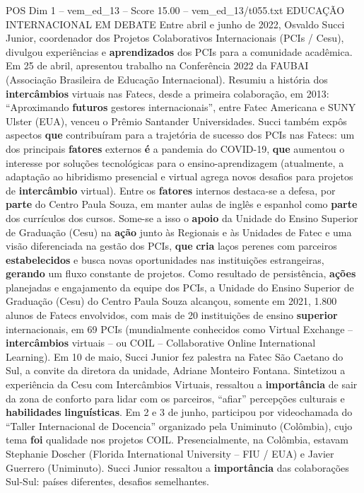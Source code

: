\begin{textsample}{POS Dim 1 – vem\_ed\_13 – Score 15.00 – vem\_ed\_13/t055.txt}  \label{ex:f1_pos_123}
EDUCAÇÃO INTERNACIONAL EM DEBATE Entre abril e junho de 2022, Osvaldo Succi Junior, coordenador dos Projetos Colaborativos Internacionais (PCIs / Cesu), divulgou experiências e \textbf{aprendizados} dos PCIs para a comunidade acadêmica.
Em 25 de abril, apresentou trabalho na Conferência 2022 da FAUBAI (Associação Brasileira de Educação Internacional).
Resumiu a história dos \textbf{intercâmbios} virtuais nas Fatecs, desde a primeira colaboração, em 2013: “Aproximando \textbf{futuros} gestores internacionais”, entre Fatec Americana e SUNY Ulster (EUA), venceu o Prêmio Santander Universidades.
Succi também expôs aspectos \textbf{que} contribuíram para a trajetória de sucesso dos PCIs nas Fatecs: um dos principais \textbf{fatores} externos \textbf{é} a pandemia do COVID-19, \textbf{que} aumentou o interesse por soluções tecnológicas para o ensino-aprendizagem (atualmente, a adaptação ao hibridismo presencial e virtual agrega novos desafios para projetos de \textbf{intercâmbio} virtual).
Entre os \textbf{fatores} internos destaca-se a defesa, por \textbf{parte} do Centro Paula Souza, em manter aulas de inglês e espanhol como \textbf{parte} dos currículos dos cursos.
Some-se a isso o \textbf{apoio} da Unidade do Ensino Superior de Graduação (Cesu) na \textbf{ação} junto às Regionais e às Unidades de Fatec e uma visão diferenciada na gestão dos PCIs, \textbf{que} \textbf{cria} laços perenes com parceiros \textbf{estabelecidos} e busca novas oportunidades nas instituições estrangeiras, \textbf{gerando} um fluxo constante de projetos.
Como resultado de persistência, \textbf{ações} planejadas e engajamento da equipe dos PCIs, a Unidade do Ensino Superior de Graduação (Cesu) do Centro Paula Souza alcançou, somente em 2021, 1.800 alunos de Fatecs envolvidos, com mais de 20 instituições de ensino \textbf{superior} internacionais, em 69 PCIs (mundialmente conhecidos como Virtual Exchange – \textbf{intercâmbios} virtuais – ou COIL – Collaborative Online International Learning).
Em 10 de maio, Succi Junior fez palestra na Fatec São Caetano do Sul, a convite da diretora da unidade, Adriane Monteiro Fontana.
Sintetizou a experiência da Cesu com Intercâmbios Virtuais, ressaltou a \textbf{importância} de sair da zona de conforto para lidar com os parceiros, “afiar” percepções culturais e \textbf{habilidades} \textbf{linguísticas}.
Em 2 e 3 de junho, participou por videochamada do “Taller Internacional de Docencia” organizado pela Uniminuto (Colômbia), cujo tema \textbf{foi} qualidade nos projetos COIL.
Presencialmente, na Colômbia, estavam Stephanie Doscher (Florida International University – FIU / EUA) e Javier Guerrero (Uniminuto).
Succi Junior ressaltou a \textbf{importância} das colaborações Sul-Sul: países diferentes, desafios semelhantes.

\end{textsample}
